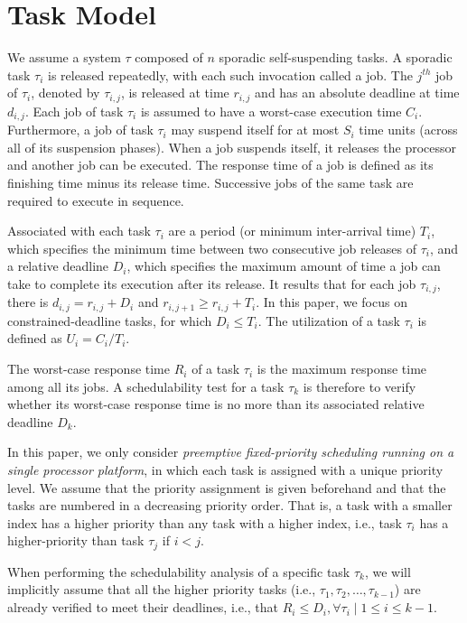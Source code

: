\section{Task Model}


We assume a system $\tau$ composed of $n$ sporadic self-suspending tasks. A sporadic task $\tau_i$ is released repeatedly, with each such invocation called a
job. The $j^{th}$ job of $\tau_i$, denoted by $\tau_{i,j}$, is released
at time $r_{i,j}$ and has an absolute deadline at time $d_{i,j}$. Each
job of task $\tau_i$ is assumed to have a worst-case execution time $C_i$. Furthermore, a job of task $\tau_i$ may suspend itself for at most $S_i$ time units (across all of its suspension phases). When a job suspends itself, it releases the processor and another job can be executed. The response time of a job is defined as its finishing time minus its release
time. Successive jobs of the same task are required to execute in
sequence. 

Associated with each task $\tau_i$ are a period (or minimum inter-arrival time) $T_i$, which
specifies the minimum time between two consecutive job releases of
$\tau_i$, and a relative deadline $D_i$, which specifies the maximum
amount of time a job can take to complete its execution after its
release. It results that for each job $\tau_{i,j}$, there is $d_{i,j}=r_{i,j}+D_i$ and $r_{i,j+1} \geq r_{i,j} + T_i$. In this paper, we focus on constrained-deadline tasks, for which
$D_i \leq T_i$. The utilization of a task $\tau_i$ is defined as $U_i=C_i/T_i$. 

The worst-case response
time $R_i$ of a task $\tau_i$ is the maximum response time among all its
jobs. A schedulability test for a task $\tau_k$
is therefore to verify whether its worst-case response time is no more than its associated relative deadline $D_k$.

In this paper, we only consider \emph{preemptive fixed-priority scheduling running on a single processor platform}, in
which each task is assigned with a unique priority level. We assume
that the priority assignment is given beforehand and that the tasks are numbered in a decreasing priority order. That is, a task with a smaller index has a higher priority than any task with a higher index, i.e., task $\tau_i$ has a higher-priority than task $\tau_{j}$ if $i < j$. 

When performing the schedulability analysis of a specific task $\tau_k$, we will implicitly assume that all the higher priority tasks (i.e., $\tau_1, \tau_2, \ldots, \tau_{k-1}$) are already verified to meet their deadlines, i.e., that $R_i \leq D_i, \forall \tau_i \mid 1 \leq i \leq k-1$. 
